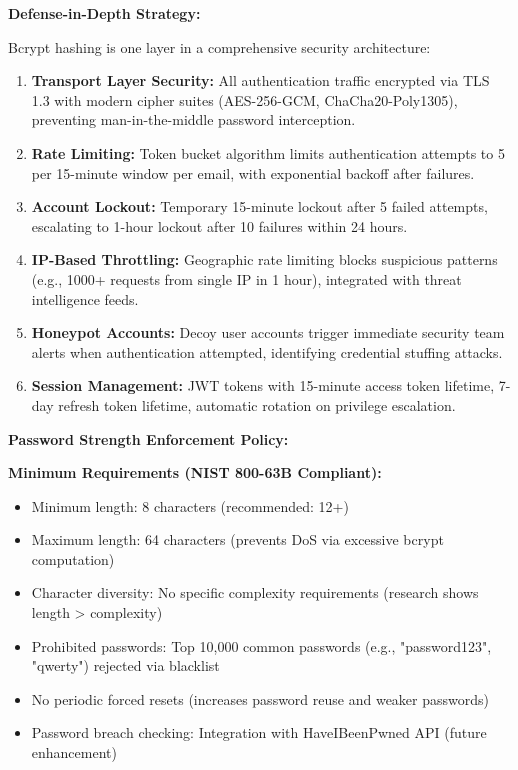 \documentclass[12pt,a4paper]{article}
\begin{document}
\begin{tcolorbox}[colback=primaryblue!5, colframe=primaryblue, boxrule=1pt, arc=3pt, left=10pt, right=10pt, top=8pt, bottom=8pt]
\textbf{Defense-in-Depth Strategy:}

Bcrypt hashing is one layer in a comprehensive security architecture:

\begin{enumerate}[leftmargin=2em, itemsep=6pt]
    \item \textbf{Transport Layer Security:} All authentication traffic encrypted via TLS 1.3 with modern cipher suites (AES-256-GCM, ChaCha20-Poly1305), preventing man-in-the-middle password interception.
    \item \textbf{Rate Limiting:} Token bucket algorithm limits authentication attempts to 5 per 15-minute window per email, with exponential backoff after failures.
    \item \textbf{Account Lockout:} Temporary 15-minute lockout after 5 failed attempts, escalating to 1-hour lockout after 10 failures within 24 hours.
    \item \textbf{IP-Based Throttling:} Geographic rate limiting blocks suspicious patterns (e.g., 1000+ requests from single IP in 1 hour), integrated with threat intelligence feeds.
    \item \textbf{Honeypot Accounts:} Decoy user accounts trigger immediate security team alerts when authentication attempted, identifying credential stuffing attacks.
    \item \textbf{Session Management:} JWT tokens with 15-minute access token lifetime, 7-day refresh token lifetime, automatic rotation on privilege escalation.
\end{enumerate}

\vspace{0.5em}

\textbf{Password Strength Enforcement Policy:}

\begin{tcolorbox}[colback=lightgray, colframe=secondaryblue, boxrule=0.8pt, arc=3pt]

\textbf{Minimum Requirements (NIST 800-63B Compliant):}

\begin{itemize}[leftmargin=2em, itemsep=5pt]
    \item Minimum length: 8 characters (recommended: 12+)
    \item Maximum length: 64 characters (prevents DoS via excessive bcrypt computation)
    \item Character diversity: No specific complexity requirements (research shows length > complexity)
    \item Prohibited passwords: Top 10,000 common passwords (e.g., "password123", "qwerty") rejected via blacklist
    \item No periodic forced resets (increases password reuse and weaker passwords)
    \item Password breach checking: Integration with HaveIBeenPwned API (future enhancement)
\end{itemize}


\end{tcolorbox}
\end{tcolorbox}
\end{document}
